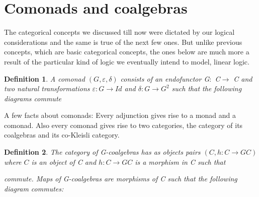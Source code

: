 \documentclass{article}
\newtheorem{definition}{Definition}
\begin{document}
\section{Comonads and coalgebras}

The categorical concepts we discussed till now
 were dictated by our logical
considerations and the same is true of the next few ones. But unlike
previous concepts, which are basic categorical concepts, the ones
below are much more a result of the particular kind of logic we eventually
intend to model, linear logic.

\begin{definition}A comonad $(G,\varepsilon,\delta)$  consists of
 an endofunctor
G$\colon$ C$\to$ C
 and two natural transformations
$\varepsilon\colon G\to Id$ and $\delta\colon G\to G^2$ such that
the following diagrams commute

\begin{center}
\end{center}
\end{definition}

A few facts about comonads:
Every adjunction gives rise to a monad and a comonad.
 Also every comonad gives rise to two categories, the category of its
coalgebras and its co-Kleisli category.

 

\begin{definition}The category of G-coalgebras has as
objects  pairs $(C, h\colon C\to GC)$ where $C$ is an object of C
and $h\colon C\to GC$ is a morphism in C such that
\begin{center}
\end{center}
commute.
Maps of G-coalgebras are morphisms of C such that the following
diagram commutes:
\begin{center}
\end{center}
\end{definition}
 
\end{document}
